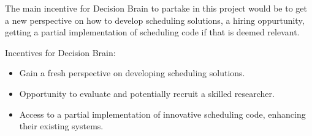 The main incentive for Decision Brain to partake in this project would be to get a new perspective on how to develop scheduling solutions,
a hiring oppurtunity, getting a partial implementation of scheduling code if that is deemed relevant.

Incentives for Decision Brain: 
\begin{itemize} 
	\item Gain a fresh perspective on developing scheduling solutions. 
	\item Opportunity to evaluate and potentially recruit a skilled researcher. 
	\item Access to a partial implementation of innovative scheduling code, enhancing their existing systems. 
\end{itemize}
